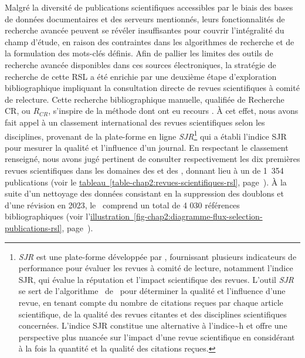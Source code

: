 \begin{refsegment}
Malgré la diversité de publications scientifiques accessibles par le biais des bases de données documentaires et des serveurs mentionnés, leurs fonctionnalités de recherche avancée peuvent se révéler insuffisantes pour couvrir l'intégralité du champ d'étude, en raison des contraintes dans les algorithmes de recherche et de la formulation des mots-clés définis. Afin de pallier les limites des outils de recherche avancée disponibles dans ces sources électroniques, la stratégie de recherche de cette \acrshort{RSL} a été enrichie par une deuxième étape d'exploration bibliographique impliquant la consultation directe de revues scientifiques à comité de relecture. Cette recherche bibliographique manuelle, qualifiée de \acrfull{Recherche CR}, ou \(R_{CR}\), s'inspire de la méthode dont ont eu recours \textcolor{blue}{\textcite[738]{padeiro_transit-oriented_2019}}. À cet effet, nous avons fait appel à un classement international des revues scientifiques selon les disciplines, provenant de la plate-forme en ligne \textsl{SJR}\footnote{
    \textsl{SJR} est une plate-forme développée par , fournissant plusieurs indicateurs de performance pour évaluer les revues à comité de lecture, notamment l'indice \acrfull{SJR}, qui évalue la réputation et l'impact scientifique des revues. L'outil \textsl{SJR} se sert de l'algorithme ~de ~pour déterminer la qualité et l'influence d'une revue, en tenant compte du nombre de citations reçues par chaque article scientifique, de la qualité des revues citantes et des disciplines scientifiques concernées. L'indice \acrshort{SJR} constitue une alternative à l'\acrfull{indice~h} et offre une perspective plus nuancée sur l'impact d'une revue scientifique en considérant à la fois la quantité et la qualité des citations reçues.
} qui a établi l'indice \acrfull{SJR} pour mesurer la qualité et l'influence d'un journal. En respectant le classement renseigné, nous avons jugé pertinent de consulter respectivement les dix premières revues scientifiques dans les domaines des  et des , donnant lieu à un  de 1~354 publications (voir le \hyperref[table-chap2:revues-scientifiques-rsl]{tableau~\ref{table-chap2:revues-scientifiques-rsl}}, page~\pageref{table-chap2:revues-scientifiques-rsl}). À la suite d'un nettoyage des données consistant en la suppression des doublons et d'une révision en 2023, le ~comprend un total de 4 030 références bibliographiques (voir l'\hyperref[fig-chap2:diagramme-flux-selection-publications-rsl]{illustration~\ref{fig-chap2:diagramme-flux-selection-publications-rsl}}, page~\pageref{fig-chap2:diagramme-flux-selection-publications-rsl}).%


\end{refsegment}
